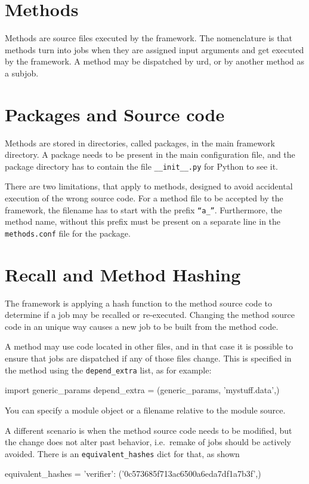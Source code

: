 \section{Methods}

Methods are source files executed by the framework.  The nomenclature
is that methods turn into jobs when they are assigned input arguments
and get executed by the framework.  A method may be dispatched by urd,
or by another method as a subjob.



\section{Packages and Source code}

Methods are stored in directories, called packages, in the main
framework directory.  A package needs to be present in the main
configuration file, and the package directory has to contain the file
\texttt{\_\_init\_\_.py} for Python to see it.

There are two limitations, that apply to methods, designed to avoid
accidental execution of the wrong source code.  For a method file to
be accepted by the framework, the filename has to start with the
prefix \texttt{``a\_''}.  Furthermore, the method name, without this
prefix must be present on a separate line in the \texttt{methods.conf}
file for the package.



\section{Recall and Method Hashing}

The framework is applying a hash function to the method source code to
determine if a job may be recalled or re-executed.  Changing the
method source code in an unique way causes a new job to be built from
the method code.

A method may use code located in other files, and in that case it is
possible to ensure that jobs are dispatched if any of those files
change.  This is specified in the method using the
\texttt{depend\_extra} list, as for example:
\begin{python}
import generic_params
depend_extra = (generic_params, 'mystuff.data',)
\end{python}
You can specify a module object or a filename relative to the module
source.

A different scenario is when the method source code needs to be
modified, but the change does not alter past behavior, i.e.\ remake of
jobs should be actively avoided.  There is an
\texttt{equivalent\_hashes} dict for that, as shown
\begin{python}
  equivalent_hashes = {'verifier': ('0c573685f713ac6500a6eda7df1a7b3f',)}
\end{python}

